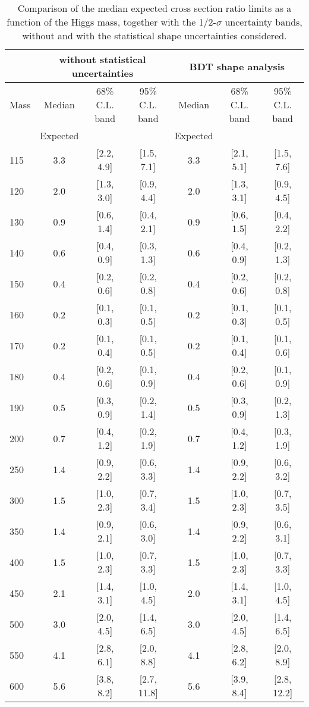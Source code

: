 \begin{table}[!ht]
\begin{center}
{\normalsize
\begin{tabular}{|l|c|c|c|c|c|c|}
\hline
      &  \multicolumn{3}{c|}{without statistical uncertainties} &\multicolumn{3}{c|}{BDT shape analysis} \\
\hline
Mass  &  Median      &     68\% C.L. band &  95\% C.L. band &  Median	   &	 68\% C.L. band &  95\% C.L. band\\
      &  Expected    &                    &                 &  Expected    &			&		 \\
\hline
115 &  3.3 & [2.2, 4.9] & [1.5, 7.1]  &  3.3 & [2.1, 5.1] & [1.5, 7.6] \\
120 &  2.0 & [1.3, 3.0] & [0.9, 4.4]  &  2.0 & [1.3, 3.1] & [0.9, 4.5] \\
130 &  0.9 & [0.6, 1.4] & [0.4, 2.1]  &  0.9 & [0.6, 1.5] & [0.4, 2.2] \\
140 &  0.6 & [0.4, 0.9] & [0.3, 1.3]  &  0.6 & [0.4, 0.9] & [0.2, 1.3] \\
150 &  0.4 & [0.2, 0.6] & [0.2, 0.8]  &  0.4 & [0.2, 0.6] & [0.2, 0.8] \\
160 &  0.2 & [0.1, 0.3] & [0.1, 0.5]  &  0.2 & [0.1, 0.3] & [0.1, 0.5] \\
170 &  0.2 & [0.1, 0.4] & [0.1, 0.5]  &  0.2 & [0.1, 0.4] & [0.1, 0.6] \\
180 &  0.4 & [0.2, 0.6] & [0.1, 0.9]  &  0.4 & [0.2, 0.6] & [0.1, 0.9] \\
190 &  0.5 & [0.3, 0.9] & [0.2, 1.4]  &  0.5 & [0.3, 0.9] & [0.2, 1.3] \\
200 &  0.7 & [0.4, 1.2] & [0.2, 1.9]  &  0.7 & [0.4, 1.2] & [0.3, 1.9] \\
250 &  1.4 & [0.9, 2.2] & [0.6, 3.3]  &  1.4 & [0.9, 2.2] & [0.6, 3.2] \\
300 &  1.5 & [1.0, 2.3] & [0.7, 3.4]  &  1.5 & [1.0, 2.3] & [0.7, 3.5] \\
350 &  1.4 & [0.9, 2.1] & [0.6, 3.0]  &  1.4 & [0.9, 2.2] & [0.6, 3.1] \\
400 &  1.5 & [1.0, 2.3] & [0.7, 3.3]  &  1.5 & [1.0, 2.3] & [0.7, 3.3] \\
450 &  2.1 & [1.4, 3.1] & [1.0, 4.5]  &  2.0 & [1.4, 3.1] & [1.0, 4.5] \\
500 &  3.0 & [2.0, 4.5] & [1.4, 6.5]  &  3.0 & [2.0, 4.5] & [1.4, 6.5] \\
550 &  4.1 & [2.8, 6.1] & [2.0, 8.8]  &  4.1 & [2.8, 6.2] & [2.0, 8.9] \\
600 &  5.6 & [3.8, 8.2] & [2.7, 11.8] &  5.6 & [3.9, 8.4] & [2.8, 12.2]\\
\hline
\end{tabular}
}
\caption{Comparison of the median expected cross section ratio limits as a function 
of the Higgs mass, together with the 1/2-$\sigma$ uncertainty bands, without and with the statistical 
shape uncertainties considered.}
\label{tab:mva_shapewithwithoutstat}
\end{center}
\end{table}

